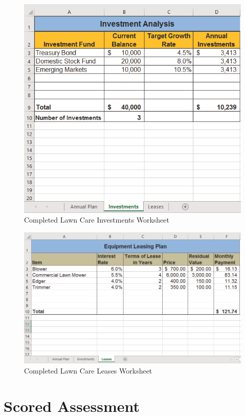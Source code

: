 \begin{figure}[H]
	\centering
	\includegraphics[width=\maxwidth{.95\linewidth}]{gfx/ch02_fig48}
	\caption{Completed Lawn Care Investments Worksheet}
	\label{02:fig48}
\end{figure}

\begin{figure}[H]
	\centering
	\includegraphics[width=\maxwidth{.95\linewidth}]{gfx/ch02_fig49}
	\caption{Completed Lawn Care Leases Worksheet}
	\label{02:fig49}
\end{figure}

\section{Scored Assessment}


